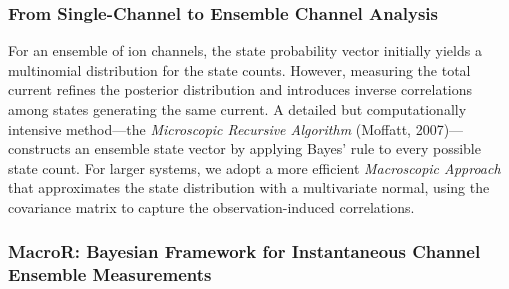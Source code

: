 \documentclass[pdflatex,sn-mathphys-num]{sn-jnl}%
\theoremstyle{thmstyleone}%
\theoremstyle{thmstyletwo}%
\theoremstyle{thmstylethree}%
\begin{document}
\subsubsection{From Single-Channel to Ensemble Channel Analysis}

For an ensemble of ion channels, the state probability vector initially yields a multinomial distribution for the state counts. However, measuring the total current refines the posterior distribution and introduces inverse correlations among states generating the same current. A detailed but computationally intensive method—the \textit{Microscopic Recursive Algorithm} (Moffatt, 2007)—constructs an ensemble state vector by applying Bayes’ rule to every possible state count. For larger systems, we adopt a more efficient \textit{Macroscopic Approach} that approximates the state distribution with a multivariate normal, using the covariance matrix to capture the observation-induced correlations.
\subsubsection{MacroR: Bayesian Framework for Instantaneous Channel Ensemble Measurements}
\end{document}
